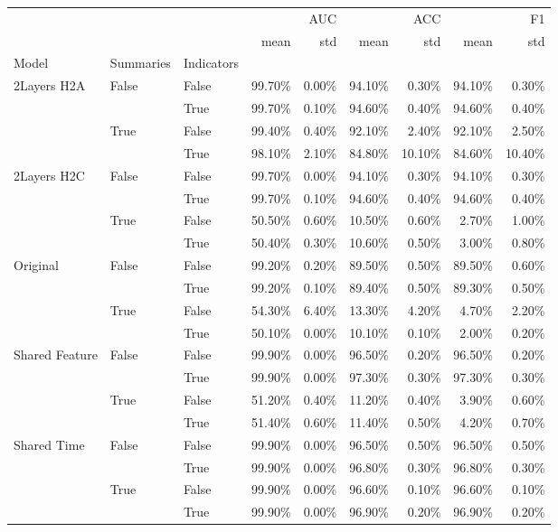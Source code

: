 \begin{tabular}{lllrrrrrr}
\toprule
 &  &  & \multicolumn{2}{r}{AUC} & \multicolumn{2}{r}{ACC} & \multicolumn{2}{r}{F1} \\
 &  &  & mean & std & mean & std & mean & std \\
Model & Summaries & Indicators &  &  &  &  &  &  \\
\midrule
\multirow[t]{4}{*}{2Layers H2A} & \multirow[t]{2}{*}{False} & False & 99.70\% & 0.00\% & 94.10\% & 0.30\% & 94.10\% & 0.30\% \\
 &  & True & 99.70\% & 0.10\% & 94.60\% & 0.40\% & 94.60\% & 0.40\% \\
\cline{2-9}
 & \multirow[t]{2}{*}{True} & False & 99.40\% & 0.40\% & 92.10\% & 2.40\% & 92.10\% & 2.50\% \\
 &  & True & 98.10\% & 2.10\% & 84.80\% & 10.10\% & 84.60\% & 10.40\% \\
\cline{1-9} \cline{2-9}
\multirow[t]{4}{*}{2Layers H2C} & \multirow[t]{2}{*}{False} & False & 99.70\% & 0.00\% & 94.10\% & 0.30\% & 94.10\% & 0.30\% \\
 &  & True & 99.70\% & 0.10\% & 94.60\% & 0.40\% & 94.60\% & 0.40\% \\
\cline{2-9}
 & \multirow[t]{2}{*}{True} & False & 50.50\% & 0.60\% & 10.50\% & 0.60\% & 2.70\% & 1.00\% \\
 &  & True & 50.40\% & 0.30\% & 10.60\% & 0.50\% & 3.00\% & 0.80\% \\
\cline{1-9} \cline{2-9}
\multirow[t]{4}{*}{Original} & \multirow[t]{2}{*}{False} & False & 99.20\% & 0.20\% & 89.50\% & 0.50\% & 89.50\% & 0.60\% \\
 &  & True & 99.20\% & 0.10\% & 89.40\% & 0.50\% & 89.30\% & 0.50\% \\
\cline{2-9}
 & \multirow[t]{2}{*}{True} & False & 54.30\% & 6.40\% & 13.30\% & 4.20\% & 4.70\% & 2.20\% \\
 &  & True & 50.10\% & 0.00\% & 10.10\% & 0.10\% & 2.00\% & 0.20\% \\
\cline{1-9} \cline{2-9}
\multirow[t]{4}{*}{Shared Feature} & \multirow[t]{2}{*}{False} & False & 99.90\% & 0.00\% & 96.50\% & 0.20\% & 96.50\% & 0.20\% \\
 &  & True & 99.90\% & 0.00\% & 97.30\% & 0.30\% & 97.30\% & 0.30\% \\
\cline{2-9}
 & \multirow[t]{2}{*}{True} & False & 51.20\% & 0.40\% & 11.20\% & 0.40\% & 3.90\% & 0.60\% \\
 &  & True & 51.40\% & 0.60\% & 11.40\% & 0.50\% & 4.20\% & 0.70\% \\
\cline{1-9} \cline{2-9}
\multirow[t]{4}{*}{Shared Time} & \multirow[t]{2}{*}{False} & False & 99.90\% & 0.00\% & 96.50\% & 0.50\% & 96.50\% & 0.50\% \\
 &  & True & 99.90\% & 0.00\% & 96.80\% & 0.30\% & 96.80\% & 0.30\% \\
\cline{2-9}
 & \multirow[t]{2}{*}{True} & False & 99.90\% & 0.00\% & 96.60\% & 0.10\% & 96.60\% & 0.10\% \\
 &  & True & 99.90\% & 0.00\% & 96.90\% & 0.20\% & 96.90\% & 0.20\% \\
\cline{1-9} \cline{2-9}
\bottomrule
\end{tabular}
